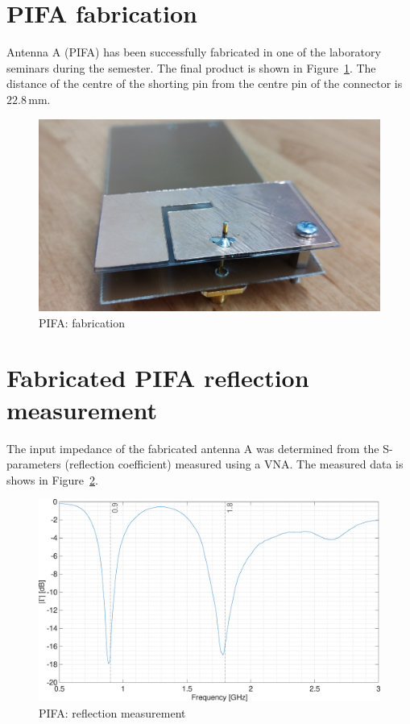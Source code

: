 \documentclass[11pt,a4paper]{article}
\begin{document}
\newpage
    \section{PIFA fabrication}
        Antenna A (PIFA) has been successfully fabricated in one of the laboratory seminars during the semester. The final product is shown in Figure~\ref{fig:pifa-fabrication}. The distance of the centre of the shorting pin from the centre pin of the connector is $22.8\, \mathrm{mm}$.
        \begin{figure}[!ht]
            \centering
            \includegraphics[width=.8\textwidth]{src/pifa-fabrication.jpg}
            \caption{\label{fig:pifa-fabrication}PIFA: fabrication}
        \end{figure}

    \section{Fabricated PIFA reflection measurement}
        The input impedance of the fabricated antenna A was determined from the S-parameters (reflection coefficient) measured using a VNA. The measured data is shows in Figure~\ref{fig:pifa-meas-reflection-linear}.
        \begin{figure}[!ht]
            \centering
            \includegraphics[width=.8\textwidth]{src/pifa-meas-reflection-linear.eps}
            \caption{\label{fig:pifa-meas-reflection-linear}PIFA: reflection measurement}
        \end{figure}
\end{document}
